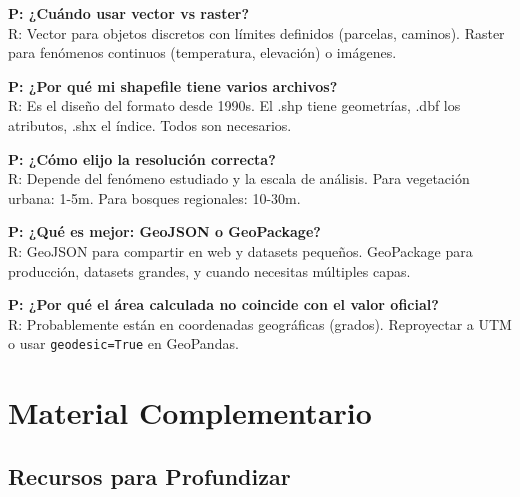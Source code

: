 \documentclass[11pt,a4paper]{article}
\begin{document}
\textbf{P: ¿Cuándo usar vector vs raster?}\\
R: Vector para objetos discretos con límites definidos (parcelas, caminos). Raster para fenómenos continuos (temperatura, elevación) o imágenes.

\textbf{P: ¿Por qué mi shapefile tiene varios archivos?}\\
R: Es el diseño del formato desde 1990s. El .shp tiene geometrías, .dbf los atributos, .shx el índice. Todos son necesarios.

\textbf{P: ¿Cómo elijo la resolución correcta?}\\
R: Depende del fenómeno estudiado y la escala de análisis. Para vegetación urbana: 1-5m. Para bosques regionales: 10-30m.

\textbf{P: ¿Qué es mejor: GeoJSON o GeoPackage?}\\
R: GeoJSON para compartir en web y datasets pequeños. GeoPackage para producción, datasets grandes, y cuando necesitas múltiples capas.

\textbf{P: ¿Por qué el área calculada no coincide con el valor oficial?}\\
R: Probablemente están en coordenadas geográficas (grados). Reproyectar a UTM o usar \texttt{geodesic=True} en GeoPandas.

\newpage

\section{Material Complementario}

\subsection{Recursos para Profundizar}
\end{document}
